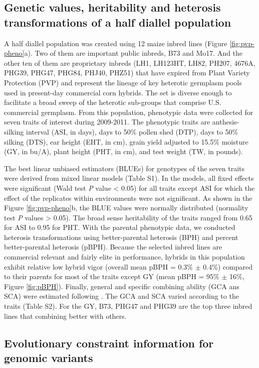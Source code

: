 \documentclass[9pt,twocolumn,twoside]{gsajnl}
\begin{document}
\subsection*{Genetic values, heritability and heterosis transformations of a half diallel population}

A half diallel population was created using 12 maize inbred lines (Figure \ref{fig:pvp-pheno}a). Two of them are important public inbreds, B73 and Mo17. And the other ten of them are proprietary inbreds (LH1, LH123HT, LH82, PH207, 4676A, PHG39, PHG47, PHG84, PHJ40, PHZ51) that have expired from Plant Variety Protection (PVP) and represent the lineage of key heterotic germplasm pools used in present-day commercial corn hybrids. The set is diverse enough to facilitate a broad sweep of the heterotic sub-groups that comprise U.S. commercial germplasm. From this population, phenotypic data were collected for seven traits of interest during 2009-2011. The phenotypic traits are anthesis-silking interval (ASI, in days), days to 50\% pollen shed (DTP), days to 50\% silking (DTS), ear height (EHT, in cm), grain yield adjusted to 15.5\% moisture (GY, in bu/A), plant height (PHT, in cm), and test weight (TW, in pounds).

The best linear unbiased estimators (BLUEs) for genotypes of the seven traits were derived from mixed linear models (Table S1). In the models, all fixed effects were significant (Wald test \emph{P} value < 0.05) for all traits except ASI for which the effect of the replicates within environments were not significant. As shown in the Figure \ref{fig:pvp-pheno}b, the BLUE values were normally distributed (normality test \emph{P} values > 0.05). The broad sense heritability of the traits ranged from 0.65 for ASI to 0.95 for PHT. With the parental phenotypic data, we conducted heterosis transformations using better-parental heterosis (BPH) and percent better-parental heterosis (pBPH). Because the selected inbred lines are commercial relevant and fairly elite in performance, hybrids in this population exhibit relative low hybrid vigor (overall mean pBPH = 0.3\% $\pm$ 0.4\%) compared to their parents for most of the traits except GY (mean pBPH = 95\% $\pm$ 16\%, Figure \ref{fig:pBPH}). Finally, general and specific combining ability (GCA ans SCA) were estimated following \citep{Falconer1996}. The GCA and SCA varied according to the traits (Table S2). For the GY, B73, PHG47 and PHG39 are the top three inbred lines that combining better with others.


\subsection*{Evolutionary constraint information for genomic variants}
\end{document}
